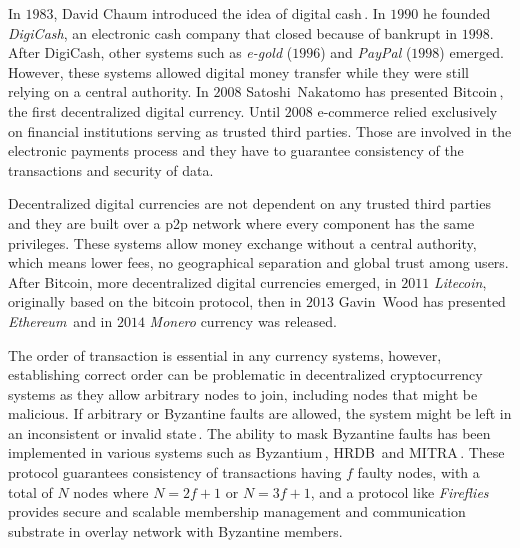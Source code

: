 \documentclass[USenglish]{uit-thesis}
\begin{document}
In $1983$, David Chaum introduced the idea of
digital cash\,\cite{chaum83blindsign}. In $1990$ he founded \emph{DigiCash},
an electronic cash company that closed because of bankrupt in
$1998$. After DigiCash, other systems such as \emph{e-gold} ($1996$) and
\emph{PayPal} ($1998$) emerged. However, these systems allowed
digital money transfer while they were still relying on a central authority.
In $2008$ Satoshi~Nakatomo has presented Bitcoin\,\cite{Nakamoto_bitcoin},
the first decentralized digital currency.
Until $2008$ e-commerce relied exclusively on financial institutions
serving as trusted third parties. Those are involved in the electronic
payments process and they have to guarantee consistency of the
transactions and security of data.

Decentralized digital currencies are not
dependent on any trusted third parties and they are built over a
\gls{p2p} network where every component has the same
privileges. These systems allow money exchange
without a central authority, which means lower fees, no geographical
separation and global trust among users. After Bitcoin,
more decentralized digital currencies emerged, in $2011$ \emph{Litecoin},
originally based on the bitcoin protocol, then in $2013$
Gavin~Wood has presented \emph{Ethereum}\,\cite{ethereum} and in
$2014$ \emph{Monero} currency was released.

The order of transaction is essential in any currency systems,
however, establishing correct order can be problematic in
decentralized cryptocurrency systems as they allow 
arbitrary nodes to join, including nodes that might be malicious.
If arbitrary or Byzantine faults are allowed,
the system might be left in an inconsistent or invalid state\,\cite{Lamport1982}.
The ability to mask Byzantine faults has been implemented in various systems such as
Byzantium\,\cite{Garcia:2011:EMB}, HRDB\,\cite{vandiver2007hrdb} and MITRA\,\cite{Luiz:2014:MBF}.
These protocol guarantees consistency of transactions having
$f$ faulty nodes, with a total of $N$ nodes where $N=2f+1$ or $N=3f+1$, and
a protocol like \emph{Fireflies}\,\cite{Johansen2015Fireflies} provides secure and
scalable membership management and communication substrate in overlay
network with Byzantine members.
\end{document}
